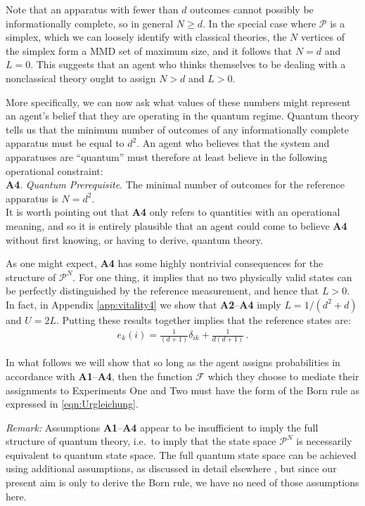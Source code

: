 \documentclass[%
 reprint,superscriptaddress,
 amsmath,amssymb,
 aps,pra, onecolumn, 12pt
]{revtex4-2}
\newcommand{\eqn}[1]{\begin{eqnarray} #1 \end{eqnarray}}
\newcommand{\tit}[1]{\textit{#1}}
\newcommand{\onestage}{{One}}
\newcommand{\twostage}{{Two}}
\begin{document}
Note that an apparatus with fewer than $d$ outcomes cannot possibly be informationally complete, so in general $N \geq d$. In the special case where $\mathcal{P}$ is a simplex, which we can loosely identify with classical theories, the $N$ vertices of the simplex form a MMD set of maximum size, and it follows that $N=d$ and $L=0$. This suggests that an agent who thinks themselves to be dealing with a nonclassical theory ought to assign $N > d$ and $L > 0$.

More specifically, we can now ask what values of these numbers might represent an agent's belief that they are operating in the quantum regime. Quantum theory tells us that the minimum number of outcomes of any informationally complete apparatus must be equal to $d^2$. An agent who believes that the system and apparatuses are ``quantum'' must therefore at least believe in the following operational constraint: \\

{\bf A4}. \tit{Quantum Prerequisite}. The minimal number of outcomes for the reference apparatus is $N=d^2$.\\

It is worth pointing out that {\bf A4} only refers to quantities with an operational meaning, and so it is entirely plausible that an agent could come to believe {\bf A4} without first knowing, or having to derive, quantum theory.

As one might expect, {\bf A4} has some highly nontrivial consequences for the structure of $\mathcal{P}^N$. For one thing, it implies that no two physically valid states can be perfectly distinguished by the reference measurement, and hence that $L>0$. In fact, in Appendix \ref{app:vitality4} we show that {\bf A2}--{\bf A4} imply $L = 1/(d^2+d)$ and $U = 2L$. Putting these results together implies that the reference states are:
\eqn{ \label{eqn:e_components}
e_k(i) = \frac{1}{(d+1)}\delta_{ik} + \frac{1}{d(d+1)} \, .
}

In what follows we will show that so long as the agent assigns probabilities in accordance with {\bf A1}--{\bf A4}, then the function $\mathcal{F}$ which they choose to mediate their assignments to Experiments \onestage{} and \twostage{} must have the form of the Born rule as expressed in \eqref{eqn:Urgleichung}.

\tit{Remark:} Assumptions {\bf A1}--{\bf A4} appear to be insufficient to imply the full structure of quantum theory, i.e.\ to imply that the state space $\mathcal{P}^N$ is necessarily equivalent to quantum state space. The full quantum state space can be achieved using additional assumptions, as discussed in detail elsewhere \cite{QPLEX}, but since our present aim is only to derive the Born rule, we have no need of those assumptions here.
\end{document}
